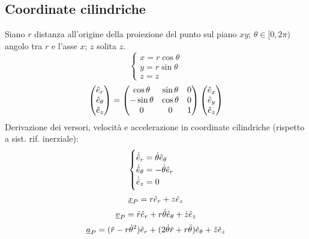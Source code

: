 \documentclass[11pt,landscape,a4paper]{article}
\begin{document}
\begin{multicols}{3}
    \subsection{Coordinate cilindriche}
        Siano $r$ distanza all'origine della proiezione del punto sul piano $xy$; $\theta \in [0, 2\pi)$ angolo tra $r$ e l'asse $x$; $z$ solita $z$.
        $$ \begin{cases}
            x = r \cos \theta \\
            y = r \sin \theta \\
            z = z
        \end{cases}$$
        $$\begin{pmatrix} \hat{e}_r \\ \hat{e}_\theta \\ \hat{e}_z \end{pmatrix} = 
            \begin{pmatrix}
                \cos \theta & \sin \theta & 0 \\
                -\sin \theta & \cos \theta & 0 \\
                0 & 0 & 1
            \end{pmatrix}
        \begin{pmatrix} \hat{e}_x \\\hat{e}_y \\\hat{e}_z \end{pmatrix}$$
        Derivazione dei versori, velocità e accelerazione in coordinate cilindriche (rispetto a sist. rif. inerziale):
        $$ \begin{cases}
            \dot{\hat{e}}_r = \dot{\theta} \hat{e}_\theta\\
            \dot{\hat{e}}_\theta = -\dot{\theta} \hat{e}_r\\
            \dot{\hat{e}}_z = 0
        \end{cases}$$
        $$ \underline{x}_P = r\hat{e}_r + z\hat{e}_z$$
        $$ \underline{v}_P = \dot{r} \hat{e}_r + r \dot{\theta} \hat{e}_\theta + \dot{z}\hat{e}_z$$
        $$ \underline{a}_P = (\ddot{r} - r \dot{\theta}^2)\hat{e}_r + (2 \dot{\theta}\dot{r} + r\ddot{\theta})\hat{e}_\theta + \ddot{z} \hat{e}_z$$

\end{multicols}
\end{document}
